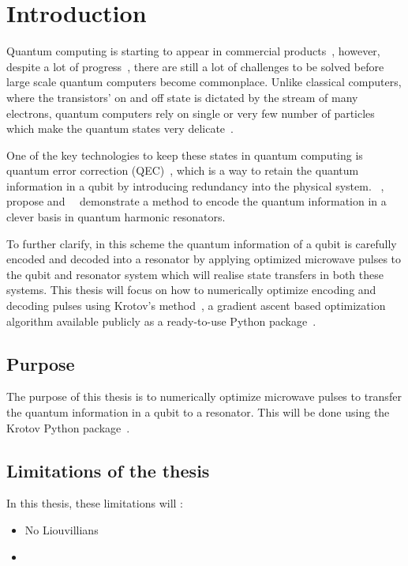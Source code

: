 \documentclass[main.tex]{subfiles}
\begin{document}
\chapter{Introduction}
Quantum computing is starting to appear in commercial products~\cite{santos_ibm_2016}, however, despite a lot of progress~\cite{preskill_quantum_2018}, there are still a lot of challenges to be solved before large scale quantum computers become commonplace.
Unlike classical computers, where the transistors' on and off state is dictated by the stream of many electrons, quantum computers rely on single or very few number of particles which make the quantum states very delicate~\cite{gottesman_introduction_2009}.

One of the key technologies to keep these states in quantum computing is quantum error correction (QEC)~\cite{gottesman_introduction_2009}, which is a way to retain the quantum information in a qubit by introducing redundancy into the physical system.
\citeauthor{leghtas_hardware-efficient_2013}~\cite{leghtas_hardware-efficient_2013},~\citeauthor{mirrahimi_dynamically_2014}~\cite{mirrahimi_dynamically_2014} propose and~\citeauthor{ofek_extending_2016}~\cite{ofek_extending_2016} demonstrate a method to encode the quantum information in a clever basis in quantum harmonic resonators.

To further clarify, in this scheme the quantum information of a qubit is carefully encoded and decoded into a resonator by applying optimized microwave pulses to the qubit and resonator system which will realise state transfers in both these systems. This thesis will focus on how to numerically optimize encoding and decoding pulses using Krotov's method~\cite{reich_monotonically_2012}, a gradient ascent based optimization algorithm available publicly as a ready-to-use Python package~\cite{goerz_krotov:_2019}.

\section{Purpose}
The purpose of this thesis is to numerically optimize microwave pulses to transfer the quantum information in a qubit to a resonator. This will be done using the Krotov Python package~\cite{goerz_krotov:_2019}.

\section{Limitations of the thesis}
In this thesis, these limitations will :
\begin{itemize}
    \item No Liouvillians
    \item %
\end{itemize}
\end{document}
